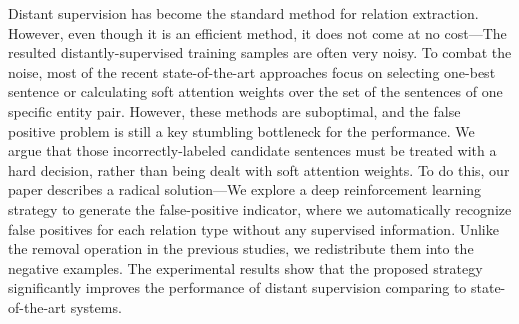 Distant supervision has become the standard method for relation extraction. However, even though it is an efficient method, it does not come at no cost---The resulted distantly-supervised training samples are often very noisy. To combat the noise, most of the recent state-of-the-art approaches focus on selecting one-best sentence or calculating soft attention weights over the set of the sentences of one specific entity pair. However, these methods are suboptimal, and the false positive problem is still a key stumbling bottleneck for the performance. We argue that those incorrectly-labeled candidate sentences must be treated with a hard decision, rather than being dealt with soft attention weights. To do this, our paper describes a radical solution---We explore a deep reinforcement learning strategy to generate the false-positive indicator, where we automatically recognize false positives for each relation type without any supervised information. Unlike the removal operation in the previous studies, we redistribute them into the negative examples. The experimental results show that the proposed strategy significantly improves the performance of distant supervision comparing to state-of-the-art systems.

